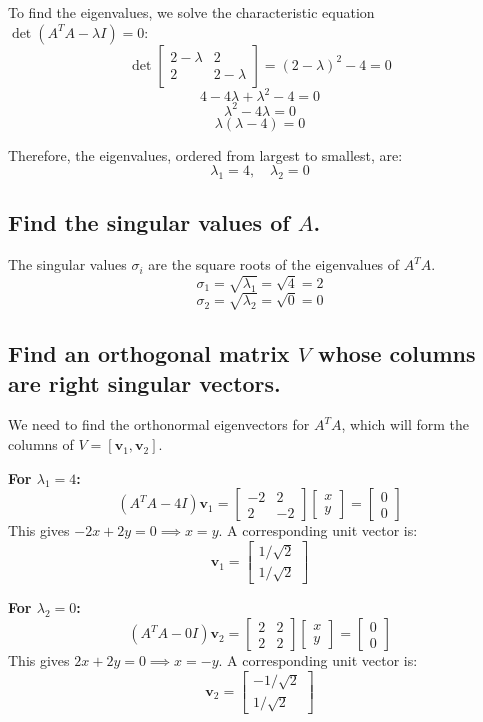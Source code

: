 To find the eigenvalues, we solve the characteristic equation $\det(A^T A - \lambda I) = 0$:
\[
	\det \begin{bmatrix} 2-\lambda & 2 \\ 2 & 2-\lambda \end{bmatrix} = (2-\lambda)^2 - 4 = 0
\]
\[
	4 - 4\lambda + \lambda^2 - 4 = 0
\]
\[
	\lambda^2 - 4\lambda = 0
\]
\[
	\lambda(\lambda - 4) = 0
\]

Therefore, the eigenvalues, ordered from largest to smallest, are:
\[
	\lambda_1 = 4, \quad \lambda_2 = 0
\]

\subsection{Find the singular values of $A$.}
The singular values $\sigma_i$ are the square roots of the eigenvalues of $A^T A$.
\[
	\sigma_1 = \sqrt{\lambda_1} = \sqrt{4} = 2
\]
\[
	\sigma_2 = \sqrt{\lambda_2} = \sqrt{0} = 0
\]

\subsection{Find an orthogonal matrix $V$ whose columns are right singular vectors.}
We need to find the orthonormal eigenvectors for $A^T A$, which will form the columns of $V = [\mathbf{v}_1, \mathbf{v}_2]$.

\textbf{For $\lambda_1 = 4$:}
\[
	(A^T A - 4I)\mathbf{v}_1 = \begin{bmatrix} -2 & 2 \\ 2 & -2 \end{bmatrix} \begin{bmatrix} x \\ y \end{bmatrix} = \begin{bmatrix} 0 \\ 0 \end{bmatrix}
\]
This gives $-2x + 2y = 0 \implies x = y$.
A corresponding unit vector is:
\[
	\mathbf{v}_1 = \begin{bmatrix} 1/\sqrt{2} \\ 1/\sqrt{2} \end{bmatrix}
\]

\textbf{For $\lambda_2 = 0$:}
\[
	(A^T A - 0I)\mathbf{v}_2 = \begin{bmatrix} 2 & 2 \\ 2 & 2 \end{bmatrix} \begin{bmatrix} x \\ y \end{bmatrix} = \begin{bmatrix} 0 \\ 0 \end{bmatrix}
\]
This gives $2x + 2y = 0 \implies x = -y$.
A corresponding unit vector is:
\[
	\mathbf{v}_2 = \begin{bmatrix} -1/\sqrt{2} \\ 1/\sqrt{2} \end{bmatrix}
\]

